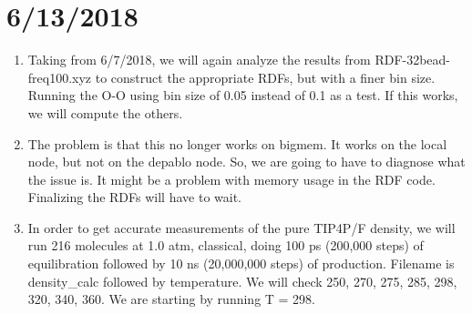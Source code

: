 \documentclass[12pt,reqno]{amsart}
\numberwithin{equation}{section}
\begin{document}
\section{6/13/2018}
\begin{enumerate}
\item Taking from 6/7/2018, we will again analyze the results from RDF-32bead-freq100.xyz to construct the appropriate RDFs, but with a finer bin size.  Running the O-O using bin size of 0.05 instead of 0.1 as a test.  If this works, we will compute the others.  
\item The problem is that this no longer works on bigmem.  It works on the local node, but not on the depablo node.  So, we are going to have to diagnose what the issue is.  It might be a problem with memory usage in the RDF code.  Finalizing the RDFs will have to wait.  
\item In order to get accurate measurements of the pure TIP4P/F density, we will run 216 molecules at 1.0 atm, classical, doing 100 ps (200,000 steps) of equilibration followed by 10 ns (20,000,000 steps) of production.  Filename is density\_calc followed by temperature.  We will check 250, 270, 275, 285, 298, 320, 340, 360.  We are starting by running T = 298.  
\end{enumerate}
\end{document}

